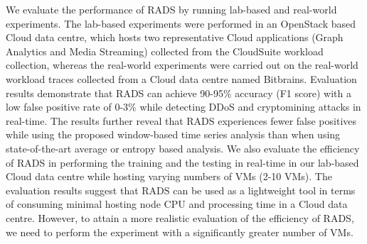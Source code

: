 We evaluate the performance of RADS by running lab-based and real-world experiments.
The lab-based experiments were performed in an OpenStack based Cloud data centre, which hosts two representative Cloud applications (Graph Analytics and Media Streaming) collected from the CloudSuite workload collection, whereas the real-world experiments were carried out on the real-world workload traces collected from a Cloud data centre named Bitbrains.
Evaluation results demonstrate that RADS can achieve 90-95\% accuracy (F1 score) with a low false positive rate of 0-3\% while detecting DDoS and cryptomining attacks in real-time. The results further reveal that RADS experiences fewer false positives while using the proposed window-based time series analysis than when using state-of-the-art average or entropy based analysis.
We also evaluate the efficiency of RADS in performing the training and the testing in real-time in our lab-based Cloud data centre while hosting varying numbers of VMs (2-10 VMs). 
The evaluation results suggest that RADS can be used as a lightweight tool in terms of consuming minimal hosting node CPU and processing time in a Cloud data centre.
However, to attain a more realistic evaluation of the efficiency of RADS, we need to perform the experiment with a significantly greater number of VMs.


\label{sec:conclusions}
